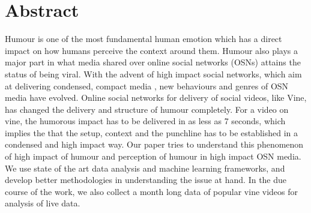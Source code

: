 \section{Abstract}
Humour is one of the most fundamental human emotion which has a direct impact on how humans perceive
the context around them. Humour also plays a major part in what media shared over online social networks (OSNs) attains the status of being viral. With the advent of high impact social networks, which aim at delivering
condensed, compact media , new behaviours and genres of OSN media have evolved. Online social networks for delivery of social videos, like Vine, has changed the delivery and structure of humour completely. For a video on vine, the humorous impact has to be delivered in as less as 7 seconds, which implies the that the setup, context and the punchline has to be established in a condensed and high impact way. Our paper tries to understand this phenomenon of high impact of humour and perception of humour in high impact OSN media. We use state of the art data analysis and machine learning frameworks, and develop better methodologies in understanding the issue at hand. In the due course of the work, we also collect a month long data of popular vine videos for analysis of live data. 